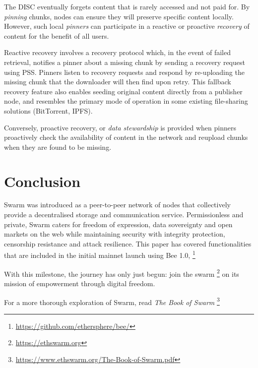 \documentclass[12pt,a4paper]{article}
\begin{document}
The DISC eventually forgets content that is rarely accessed and not paid for. By \emph{pinning} chunks, nodes can ensure they will preserve specific content locally. However, such local \emph{pinners} can participate in a reactive or proactive \emph{recovery} of content for the benefit of all users.

Reactive recovery involves a recovery protocol which, in the event of failed retrieval, notifies a pinner about a missing chunk by sending a recovery request using PSS. Pinners listen to recovery requests and respond by re-uploading the missing chunk that the downloader will then find upon retry. This fallback recovery feature also enables seeding original content directly from a publisher node, and resembles the primary mode of operation in some existing file-sharing solutions (BitTorrent, IPFS).

Conversely, proactive recovery, or \emph{data stewardship} is provided when pinners proactively check the availability of content in the network and reupload chunks when they are found to be missing.

\section{Conclusion}
Swarm was introduced as a peer-to-peer network of nodes that collectively provide a decentralised storage and communication service. Permissionless and private, Swarm caters for freedom of expression, data sovereignty and open markets on the web while maintaining security with integrity protection, censorship resistance and attack resilience. This paper has covered functionalities that are included in the initial mainnet launch using Bee 1.0,%
\footnote{\url{https://github.com/ethersphere/bee/}}
%


With this milestone, the journey has only just begun: join the swarm%
\footnote{\url{https://ethswarm.org}}
%
on its mission of empowerment through digital freedom.

For a more thorough exploration of Swarm, read \emph{The Book of Swarm}%
\footnote{\url{https://www.ethswarm.org/The-Book-of-Swarm.pdf}}
\end{document}
